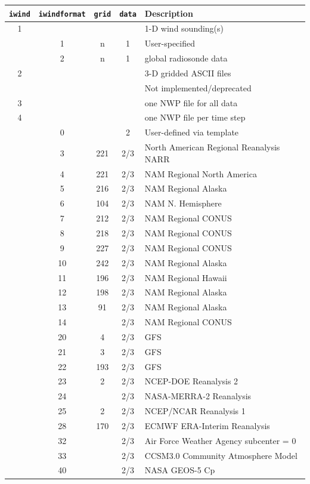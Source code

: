 \small
\begin{table}[htbp]
\begin{center}
\begin{tabular}{| c | c| c | c | l |}
\hline
\texttt{iwind} & \texttt{iwindformat} & \texttt{grid} & \texttt{data} &Description \\
\hline
1& & & & 1-D wind sounding(s) \\
\hline
 &1&n&1& User-specified \\
 &2&n&1& global radiosonde data \\
\hline
2& & & &3-D gridded ASCII files \\
 & & & &Not implemented/deprecated\\
\hline
3& & & &one NWP file for all data\\
4& & & &one NWP file per time step\\
\hline
 & 0& &2&User-defined via template\\
 & 3&221&2/3&North American Regional Reanalysis NARR\\
 & 4&221&2/3&NAM Regional North America\\
 & 5&216&2/3&NAM Regional Alaska\\
 & 6&104&2/3&NAM N. Hemisphere\\
 & 7&212&2/3&NAM Regional CONUS\\
 & 8&218&2/3&NAM Regional CONUS\\
 & 9&227&2/3&NAM Regional CONUS\\
 &10&242&2/3&NAM Regional Alaska\\
 &11&196&2/3&NAM Regional Hawaii\\
 &12&198&2/3&NAM Regional Alaska\\
 &13& 91&2/3&NAM Regional Alaska\\
 &14&   &2/3&NAM Regional CONUS \\
 &20&  4&2/3&GFS\\
 &21&  3&2/3&GFS\\
 &22&193&2/3&GFS\\
 &23&  2&2/3&NCEP-DOE Reanalysis 2\\
 &24&   &2/3&NASA-MERRA-2 Reanalysis\\
 &25&  2&2/3&NCEP/NCAR Reanalysis 1\\
 &28&170&2/3&ECMWF ERA-Interim Reanalysis\\
 &32&   &2/3&Air Force Weather Agency subcenter = 0\\
 &33&   &2/3&CCSM3.0 Community Atmosphere Model\\
 &40&   &2/3&NASA GEOS-5 Cp\\

\end{tabular}
\end{center}
\end{table}
